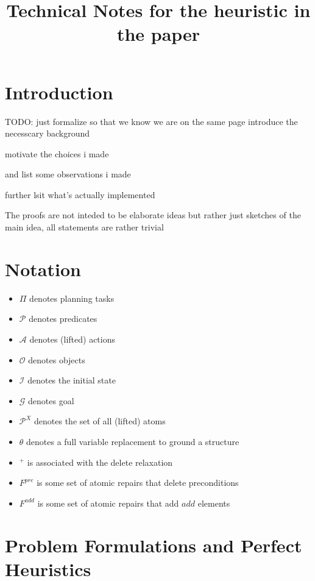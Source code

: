 \documentclass[twocolumn]{article}
\title{Technical Notes for the heuristic in the paper}
\newcommand{\task}{\ensuremath{\Pi}\xspace}
\newcommand{\preds}{\ensuremath{\mathcal{P}}\xspace}
\newcommand{\acts}{\ensuremath{\mathcal{A}}\xspace}
\newcommand{\objects}{\ensuremath{\mathcal{O}}\xspace}
\newcommand{\init}{\ensuremath{\mathcal{I}}\xspace}
\newcommand{\goal}{\ensuremath{\mathcal{G}}\xspace}
\newcommand{\vars}{\ensuremath{X}\xspace}
\newcommand{\varRepl}{\ensuremath{\theta}\xspace}
\newcommand{\atoms}{\ensuremath{\preds^{\vars}}\xspace}
\newcommand{\prename}{\ensuremath{pre}\xspace}
\newcommand{\addname}{\ensuremath{add}\xspace}
\newcommand{\fixPre}{\ensuremath{F^{\prename}}\xspace}
\newcommand{\fixAdd}{\ensuremath{F^{\addname}}\xspace}
\begin{document}
	
	\maketitle
	
	\section{Introduction}
	
	TODO: 
	just formalize so that we know we are on the same page
	introduce the necesscary background
	
	motivate the choices i made 
	
	and list some observations i made
	
	further lsit what's actually implemented
	
	The proofs are not inteded to be elaborate ideas but rather just sketches of the main idea, all statements are rather trivial
	
	\section{Notation}
	
	\begin{itemize}[noitemsep]
		\item \task denotes planning tasks
		\item \preds denotes predicates
		\item \acts denotes (lifted) actions
		\item \objects denotes objects
		\item \init denotes the initial state
		\item \goal denotes goal
		\item \atoms denotes the set of all (lifted) atoms
		\item \varRepl denotes a full variable replacement to ground a structure
		\item $^+$ is associated with the delete relaxation
		\item \fixPre is some set of atomic repairs that delete preconditions
		\item \fixAdd is some set of atomic repairs that add \addname elements
	\end{itemize}
	
	
	\section{Problem Formulations and Perfect Heuristics}
	
\end{document}

